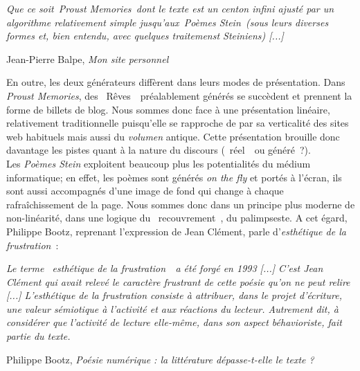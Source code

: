 \documentclass{article}
\newenvironment{citationbox}
{\begin{center}
		\begin{minipage}{.8\textwidth}
		}
		{
		\end{minipage}	
\end{center}
}
\begin{document}
				\begin{citationbox}
				\textit{Que ce soit Proust Memories dont le texte est un centon infini ajusté par un algorithme relativement simple jusqu'aux Poèmes Stein (sous leurs diverses formes et, bien entendu, avec quelques traitemenst Steiniens) [...]}
					\begin{flushright}
						Jean-Pierre Balpe, \textit{Mon site personnel} \autocite{balpe_blog}
					\end{flushright}
				\end{citationbox}
				
				En outre, les deux générateurs diffèrent dans leurs modes de présentation. Dans \textit{Proust Memories}, des \guillemotleft~Rêves~\guillemotright~préalablement générés se succèdent et prennent la forme de billets de blog. Nous sommes donc face à une présentation linéaire, relativement traditionnelle puisqu'elle se rapproche de par sa verticalité des sites web habituels mais aussi du \textit{volumen} antique. Cette présentation brouille donc davantage les pistes quant à la nature du discours (\guillemotleft~réel~\guillemotright~ou généré ?).\\
				Les \textit{Poèmes Stein} exploitent beaucoup plus les potentialités du médium informatique; en effet, les poèmes sont générés \textit{on the fly} et portés à l'écran, ils sont aussi accompagnés d'une image de fond qui change à chaque rafraîchissement de la page. Nous sommes donc dans un principe plus moderne de non-linéarité, dans une logique du \guillemotleft~recouvrement~\guillemotright, du palimpseste. A cet égard, Philippe Bootz, reprenant l'expression de Jean Clément, parle d'\textit{esthétique de la frustration}~:
				\begin{citationbox}
					\textit{Le terme \guillemotleft~esthétique de la frustration~\guillemotright~a été forgé en 1993 [...] C’est Jean Clément qui avait
					relevé le caractère frustrant de cette poésie qu’on ne peut relire [...] L’esthétique de
					la frustration consiste à attribuer, dans le projet d’écriture, une valeur sémiotique à l’activité et
					aux réactions du lecteur. Autrement dit, à considérer que l’activité de lecture elle-même, dans
					son aspect béhavioriste, fait partie du texte.}
					\begin{flushright}
						Philippe Bootz, \textit{Poésie numérique : la littérature dépasse-t-elle le texte ?} \autocite{bootz2005}
					\end{flushright} 
				\end{citationbox}
				
\end{document}
